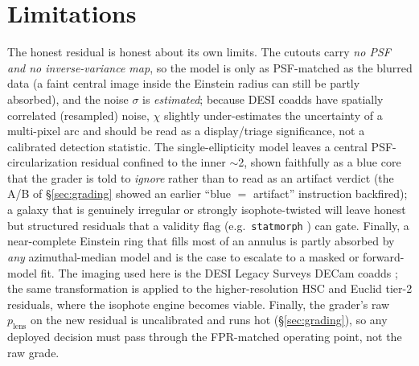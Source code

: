 \documentclass[11pt,letterpaper]{article}
\newcommand{\plens}{\ensuremath{p_{\mathrm{lens}}}}
\begin{document}
\section{Limitations}
The honest residual is honest about its own limits. The cutouts carry \emph{no PSF and no inverse-variance map},
so the model is only as PSF-matched as the blurred data (a faint central image inside the Einstein radius can
still be partly absorbed), and the noise $\sigma$ is \emph{estimated}; because DESI coadds have spatially
correlated (resampled) noise, $\chi$ slightly under-estimates the uncertainty of a multi-pixel arc and should be
read as a display/triage significance, not a calibrated detection statistic. The single-ellipticity model leaves a
central PSF-circularization residual confined to the inner $\sim$2\arcsec, shown faithfully as a blue core that the
grader is told to \emph{ignore} rather than to read as an artifact verdict (the A/B of \S\ref{sec:grading} showed an
earlier ``blue $=$ artifact'' instruction backfired); a galaxy that is genuinely irregular or strongly
isophote-twisted will leave honest but structured residuals that a validity flag (e.g.\ \texttt{statmorph}
\citep{rodriguezgomez2019statmorph}) can gate. Finally, a near-complete
Einstein ring that fills most of an annulus is partly absorbed by \emph{any} azimuthal-median model and is the
case to escalate to a masked or forward-model fit. The imaging used here is the DESI Legacy Surveys DECam coadds
\citep{legacysurvey}; the same transformation is applied to the higher-resolution HSC and Euclid tier-2 residuals,
where the isophote engine becomes viable. Finally, the grader's raw \plens{} on the new residual is uncalibrated and
runs hot (\S\ref{sec:grading}), so any deployed decision must pass through the FPR-matched operating point, not the
raw grade.



\end{document}
